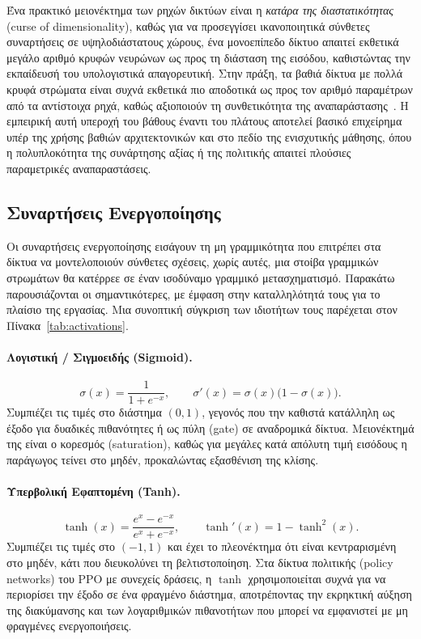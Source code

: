 Ένα πρακτικό μειονέκτημα των ρηχών δικτύων  είναι η \emph{κατάρα της
διαστατικότητας} (curse of dimensionality), καθώς για να προσεγγίσει ικανοποιητικά
σύνθετες συναρτήσεις σε υψηλοδιάστατους χώρους, ένα μονοεπίπεδο δίκτυο
απαιτεί εκθετικά μεγάλο αριθμό κρυφών νευρώνων ως προς τη διάσταση της
εισόδου, καθιστώντας την εκπαίδευσή του υπολογιστικά απαγορευτική. Στην
πράξη, τα βαθιά δίκτυα με πολλά κρυφά στρώματα είναι συχνά εκθετικά πιο
αποδοτικά ως προς τον αριθμό παραμέτρων από τα αντίστοιχα ρηχά, καθώς
αξιοποιούν τη συνθετικότητα της αναπαράστασης~\cite{goodfellow2016,lecun2015deeplearning}.
Η εμπειρική αυτή υπεροχή του βάθους έναντι του πλάτους αποτελεί βασικό
επιχείρημα υπέρ της χρήσης βαθιών αρχιτεκτονικών και στο πεδίο της
ενισχυτικής μάθησης, όπου η πολυπλοκότητα της συνάρτησης αξίας ή της
πολιτικής απαιτεί πλούσιες παραμετρικές αναπαραστάσεις.


\subsection{Συναρτήσεις Ενεργοποίησης}
\label{subsec:activations}

Οι συναρτήσεις ενεργοποίησης εισάγουν τη μη γραμμικότητα που επιτρέπει στα
δίκτυα να μοντελοποιούν σύνθετες σχέσεις, χωρίς αυτές, μια στοίβα γραμμικών
στρωμάτων θα κατέρρεε σε έναν ισοδύναμο γραμμικό μετασχηματισμό. Παρακάτω
παρουσιάζονται οι σημαντικότερες, με έμφαση στην καταλληλότητά τους για το
πλαίσιο της εργασίας. Μια συνοπτική σύγκριση των ιδιοτήτων τους παρέχεται στον
Πίνακα~\ref{tab:activations}.

\paragraph{Λογιστική / Σιγμοειδής (Sigmoid).}
\begin{equation}
    \sigma(x) = \frac{1}{1+e^{-x}}, \qquad
    \sigma'(x) = \sigma(x)\big(1-\sigma(x)\big).
    \label{eq:sigmoid}
\end{equation}
Συμπιέζει τις τιμές στο διάστημα $(0,1)$, γεγονός που την καθιστά κατάλληλη ως
έξοδο για δυαδικές πιθανότητες ή ως πύλη (gate) σε
αναδρομικά δίκτυα. Μειονέκτημά της είναι ο κορεσμός
(saturation), καθώς για μεγάλες κατά απόλυτη τιμή
εισόδους η παράγωγος τείνει στο μηδέν, προκαλώντας εξασθένιση της κλίσης.

\paragraph{Υπερβολική Εφαπτομένη (Tanh).}
\begin{equation}
    \tanh(x) = \frac{e^{x}-e^{-x}}{e^{x}+e^{-x}}, \qquad
    \tanh'(x) = 1 - \tanh^2(x).
    \label{eq:tanh}
\end{equation}
Συμπιέζει τις τιμές στο $(-1,1)$ και έχει το πλεονέκτημα ότι είναι
κεντραρισμένη στο μηδέν, κάτι που διευκολύνει τη βελτιστοποίηση. Στα
δίκτυα πολιτικής (policy networks) του PPO με
συνεχείς δράσεις, η $\tanh$ χρησιμοποιείται συχνά για να περιορίσει την έξοδο
σε ένα φραγμένο διάστημα, αποτρέποντας την εκρηκτική αύξηση της διακύμανσης
και των λογαριθμικών πιθανοτήτων που μπορεί να εμφανιστεί με μη φραγμένες
ενεργοποιήσεις.


